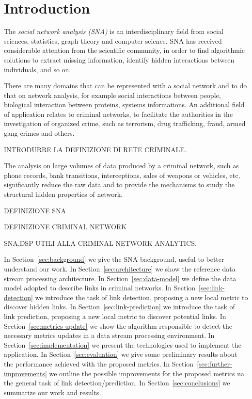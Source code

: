 \section{Introduction}
\label{sec:introduction}

The \textit{social network analysis (SNA)} is an interdisciplinary field from social sciences, statistics, graph theory and computer science. SNA has received considerable attention from the scientific community, in order to find algorithmic solutions to extract missing information, identify hidden interactions between individuals, and so on.
 
There are many domains that can be represented with a social network and to do that on network analysis, for example social interactions between people, biological interaction between proteins, systems informations. An additional field of application relates to criminal networks, to facilitate the authorities in the investigation of organized crime, such as terrorism, drug trafficking, fraud, armed gang crimes and others\cite{xu2005criminal}. 

INTRODURRE LA DEFINIZIONE DI RETE CRIMINALE.

The analysis on large volumes of data produced by a criminal network, such as phone records, bank transitions, interceptions, sales of weapons or vehicles, etc, significantly reduce the raw data and to provide the mechanisms to study the structural hidden properties of network\cite{xu2005criminal}.

DEFINIZIONE SNA

DEFINIZIONE CRIMINAL NETWORK

SNA,DSP UTILI ALLA CRIMINAL NETWORK ANALYTICS.

In Section~\ref{sec:background} we give the SNA background, useful to better understand our work.
In Section~\ref{sec:architecture} we show the reference data stream processing architecture.
In Section~\ref{sec:data-model} we define the data model adopted to describe links in criminal networks.
In Section~\ref{sec:link-detection} we introduce the task of link detection, proposing a new local metric to discover hidden links.
In Section~\ref{sec:link-prediction} we introduce the task of link prediction, proposing a new local metric to discover potential links.
In Section~\ref{sec:metrics-update} we show the algorithm responsible to detect the necessary metrics updates in a data stream processing environment.
In Section~\ref{sec:implementation} we present the technologies used to implement the application.
In Section~\ref{sec:evaluation} we give some preliminary results about the performance achieved with the proposed metrics.
In Section~\ref{sec:further-improvements} we outline the possible improvements for the proposed metrics na the general task of link detection/prediction.
In Section~\ref{sec:conclusions} we summarize our work and results.
